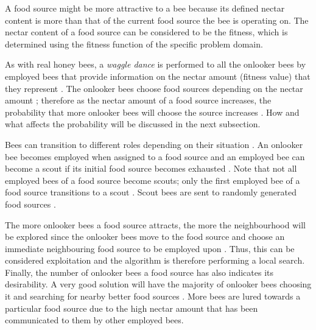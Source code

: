 A food source might be more attractive to a bee because its defined nectar content is more than that of the current food source the bee is operating on\cite{ABCCompareStudy,ABCNumericalOptimization}. The nectar content of a food source can be considered to be the fitness, which is determined using the fitness function of the specific problem domain\cite{ABCCompareStudy,ABCNumericalOptimization}.

As with real honey bees, a \emph{waggle dance} is performed to all the onlooker bees by employed bees that provide information on the nectar amount (fitness value) that they represent \cite{ABCReconfigDistro,ABCCompareStudy,ABCImageEnhancement}. The onlooker bees choose food sources depending on the nectar amount \cite{ABCReconfigDistro,ABCCompareStudy,ABCImageEnhancement}; therefore as the nectar amount of a food source increases, the probability that more onlooker bees will choose the source increases \cite{ABCReconfigDistro,ABCCompareStudy,ABCImageEnhancement}. How and what affects the probability will be discussed in the next subsection.

Bees can transition to different roles depending on their situation \cite{ABCCompareStudy,ABCNumericalOptimization}. An onlooker bee becomes employed when assigned to a food source and an employed bee can become a scout if its initial food source becomes exhausted \cite{ABCImageEnhancement,ABCCompareStudy,ABCReconfigDistro}. Note that not all employed bees of a food source become scouts; only the first employed bee of a food source transitions to a scout \cite{ABCImageEnhancement,ABCCompareStudy,ABCReconfigDistro}. Scout bees are sent to randomly generated food sources \cite{ABCImageEnhancement,ABCCompareStudy,ABCReconfigDistro}. 

The more onlooker bees a food source attracts, the more the neighbourhood will be explored since the onlooker bees move to the food source and choose an immediate neighbouring food source to be employed upon \cite{ABCCompareStudy,ABCNumericalOptimization}. Thus, this can be considered exploitation and the algorithm is therefore performing a local search\cite{ABCCompareStudy,ABCReconfigDistro,ABCNumericalOptimization}. Finally, the number of onlooker bees a food source has also indicates its desirability. A very good solution will have the majority of onlooker bees choosing it and searching for nearby better food sources \cite{ABCCompareStudy,ABCReconfigDistro,ABCNumericalOptimization}. More bees are lured towards a particular food source due to the high nectar amount that has been communicated to them by other employed bees\cite{ABCCompareStudy,ABCReconfigDistro,ABCNumericalOptimization}.


